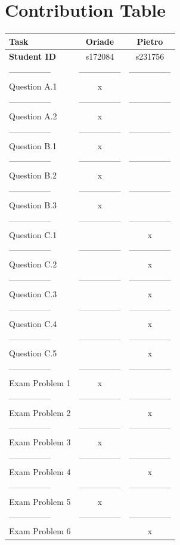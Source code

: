 \documentclass[
]{article}
\begin{document}
\newpage

\newpage
\setcounter{tocdepth}{4}
\tableofcontents

\newpage

\hypertarget{contribution-table}{%
\section{Contribution Table}\label{contribution-table}}

\begin{longtable}[]{@{}lcc@{}}
\toprule
Task & Oriade & Pietro \\
\midrule
\endhead
\textbf{Student ID} & s172084 & s231756 \\
--------------- & --------------- & --------------- \\
Question A.1 & x & \\
--------------- & --------------- & --------------- \\
Question A.2 & x & \\
--------------- & --------------- & --------------- \\
Question B.1 & x & \\
--------------- & --------------- & --------------- \\
Question B.2 & x & \\
--------------- & --------------- & --------------- \\
Question B.3 & x & \\
--------------- & --------------- & --------------- \\
Question C.1 & & x \\
--------------- & --------------- & --------------- \\
Question C.2 & & x \\
--------------- & --------------- & --------------- \\
Question C.3 & & x \\
--------------- & --------------- & --------------- \\
Question C.4 & & x \\
--------------- & --------------- & --------------- \\
Question C.5 & & x \\
--------------- & --------------- & --------------- \\
Exam Problem 1 & x & \\
--------------- & --------------- & --------------- \\
Exam Problem 2 & & x \\
--------------- & --------------- & --------------- \\
Exam Problem 3 & x & \\
--------------- & --------------- & --------------- \\
Exam Problem 4 & & x \\
--------------- & --------------- & --------------- \\
Exam Problem 5 & x & \\
--------------- & --------------- & --------------- \\
Exam Problem 6 & & x \\
\bottomrule
\end{longtable}
\end{document}
